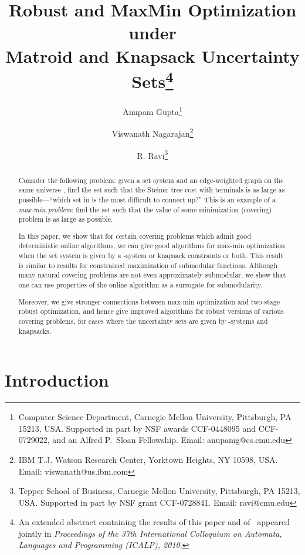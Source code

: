 \documentclass[11pt,letterpaper]{article}
\begin{document}
\title{Robust and MaxMin Optimization under \\Matroid and Knapsack
  Uncertainty Sets\thanks{An extended abstract containing the results of
    this paper and of~\cite{GNR-k-rob} appeared jointly in
    \emph{Proceedings of the 37th International Colloquium on Automata,
      Languages and Programming (ICALP), 2010}.}}

\author{
Anupam Gupta\thanks{Computer Science Department, Carnegie Mellon
    University, Pittsburgh, PA 15213, USA. Supported in part by
    NSF awards CCF-0448095 and CCF-0729022, and an Alfred P.~Sloan
    Fellowship. Email: anupamg@cs.cmu.edu}
\and Viswanath Nagarajan\thanks{IBM T.J. Watson Research Center, Yorktown Heights, NY 10598, USA. Email:
viswanath@us.ibm.com} \and R. Ravi\thanks{Tepper School of Business, Carnegie Mellon University,
  Pittsburgh, PA 15213, USA. Supported in part by NSF grant
  CCF-0728841. Email: ravi@cmu.edu}
}
\date{}
\maketitle

\begin{abstract}
  Consider the following problem: given a set system  and an edge-weighted
  graph  on the same universe , find the set  such
  that the Steiner tree cost with terminals  is as large as
  possible---``which set in  is the most difficult to connect up?''
  This is an example of a \emph{max-min problem}: find the set  such that the value of some minimization (covering) problem is as
  large as possible.

  In this paper, we show that for certain covering problems which admit
  good deterministic online algorithms, we can give good algorithms for
  max-min optimization when the set system  is given by a -system
  or knapsack constraints or both. This result is similar to results for constrained
  maximization of submodular functions. Although many natural covering problems
  are not even approximately submodular, we show that one can use
  properties of the online algorithm as a surrogate for submodularity.

  Moreover, we give stronger connections between max-min optimization
  and two-stage robust optimization, and hence give improved algorithms
  for robust versions of various covering problems, for cases where the
  uncertainty sets are given by -systems and  knapsacks.
\end{abstract}

\section{Introduction}
\end{document}
